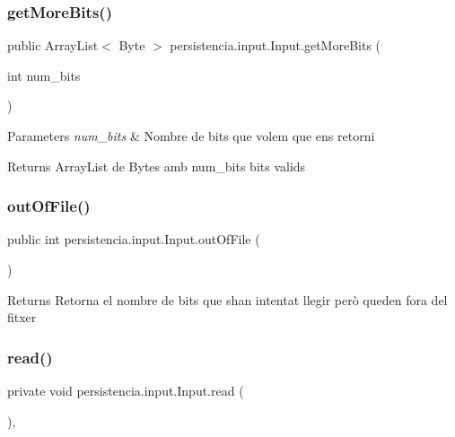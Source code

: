 \subsubsection{\texorpdfstring{get\+More\+Bits()}{getMoreBits()}}
{\footnotesize\ttfamily public Array\+List$<$ Byte $>$ persistencia.\+input.\+Input.\+get\+More\+Bits (\begin{DoxyParamCaption}\item[{int}]{num\+\_\+bits }\end{DoxyParamCaption})\hspace{0.3cm}{\ttfamily [inline]}}


\begin{DoxyParams}{Parameters}
{\em num\+\_\+bits} & Nombre de bits que volem que ens retorni \\
\hline
\end{DoxyParams}
\begin{DoxyReturn}{Returns}
Array\+List de Bytes amb num\+\_\+bits bits valids 
\end{DoxyReturn}
\mbox{\label{classpersistencia_1_1input_1_1Input_a3f0fc057e91430b81f5f2c92f91b8ed7}} 
\subsubsection{\texorpdfstring{out\+Of\+File()}{outOfFile()}}
{\footnotesize\ttfamily public int persistencia.\+input.\+Input.\+out\+Of\+File (\begin{DoxyParamCaption}{ }\end{DoxyParamCaption})\hspace{0.3cm}{\ttfamily [inline]}}

\begin{DoxyReturn}{Returns}
Retorna el nombre de bits que s\textquotesingle{}han intentat llegir però queden fora del fitxer 
\end{DoxyReturn}
\mbox{\label{classpersistencia_1_1input_1_1Input_a24eae4109b4ff4954ff2d7feef2fa4e4}} 
\subsubsection{\texorpdfstring{read()}{read()}}
{\footnotesize\ttfamily private void persistencia.\+input.\+Input.\+read (\begin{DoxyParamCaption}{ }\end{DoxyParamCaption})\hspace{0.3cm}{\ttfamily [inline]}, {\ttfamily [private]}}



